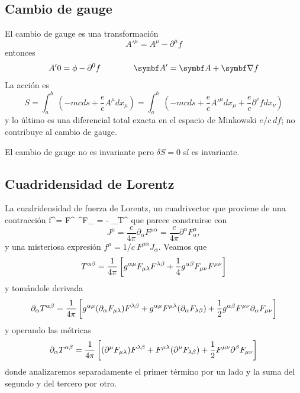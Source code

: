 \documentclass[10pt,oneside]{CBFT_book}
\begin{document}
\subsection{Cambio de gauge}

El cambio de gauge es una transformación 
\[
	A'^\mu = A^\mu - \partial^\mu f
\]
entonces 
\[
	A'0 = \phi - \partial^0 f \qquad \qquad \vb{A}' = \vb{A} + \Nabla f
\]
La acción es 
\[
	S = \int_a^b \: \left( - m c ds + \frac{e}{c} A^\mu dx_\mu \right) =
	\int_a^b \: \left( - m c ds + \frac{e}{c} {A'}^\mu dx_\mu + \frac{e}{c} \partial^\nu f dx_\nu \right)
\]
y lo último es una diferencial total exacta en el espacio de Minkowski $e/c \: df$; 
no contribuye al cambio de gauge.

El cambio de gauge no es invariante pero $\delta S = 0$ sí es invariante.

\subsection{Cuadridensidad de Lorentz}

La cuadridensidad de fuerza de Lorentz, un cuadrivector que proviene de una contracción
\be
	f^\beta =  F^{\mu\beta} \partial^\alpha F_{\alpha\beta} = 
	- \partial_\alpha T^{\alpha\beta}
	\label{4densidad_fuerza_lorentz}
\ee
que parece construirse con 
\[
	J^\mu = \frac{c}{4\pi} \partial_\alpha F^{\mu\alpha} = 
	\frac{c}{4\pi} \partial^\alpha F^\mu_\alpha,
\]
y una misteriosa expresión $ f^\mu = 1/c \: F^{\mu\alpha}J_\alpha$.
Veamos que
\[
	T_{}^{\alpha\beta} = \frac{1}{4\pi} \left[ g^{\alpha\mu } F_{\mu\lambda} F^{\lambda\beta}
	+ \frac{1}{4} g^{\alpha\beta} F_{\mu\nu} F^{\mu\nu} \right]
\]
y tomándole derivada
\[
	\partial_\alpha T_{}^{\alpha\beta} = \frac{1}{4\pi} \left[  
	g^{\alpha\mu}( \partial_\alpha F_{\mu\lambda}) F^{\lambda\beta} +
	g^{\alpha\mu} F^{\mu\lambda} ( \partial_\alpha F_{\lambda\beta} )  +
	\frac{1}{2} g^{\alpha\beta} F^{\mu\nu} \partial_\alpha F_{\mu\nu} 
	\right]
\]
y operando las métricas
\[
	\partial_\alpha T_{}^{\alpha\beta} = \frac{1}{4\pi} \left[  
	( \partial^\mu F_{\mu\lambda} ) F^{\lambda\beta} +
	F^{\mu\lambda} ( \partial^\mu F_{\lambda\beta} )  +
	\frac{1}{2} F^{\mu\nu} \partial^\beta F_{\mu\nu} 
	\right]
\]
donde analizaremos separadamente el primer término por un lado y la suma del segundo y del
tercero por otro.
\end{document}

